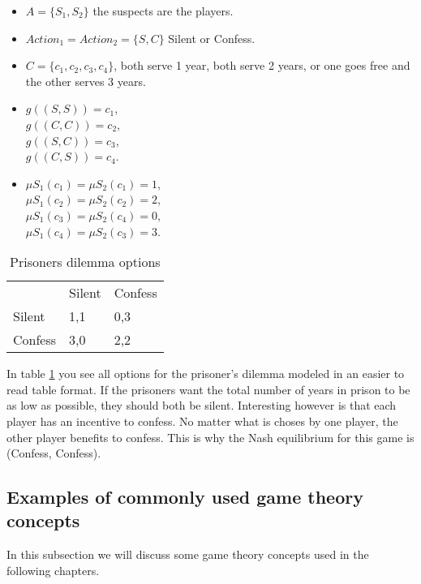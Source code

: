 \begin{itemize}
    \item $A = \{S_{1}, S_{2} \}$ the suspects are the players.
    \item $Action_{1} = Action_{2} = \{S, C\}$ Silent or Confess.
    \item $C = \{c_{1},c_{2},c_{3},c_{4}\}$, both serve 1 year, both serve 2 years, or one goes free and the other serves 3 years.
    \item $g((S,S)) = c_{1}$, \\
    $g((C,C)) = c_{2}$, \\
    $g((S,C)) = c_{3}$, \\
    $g((C,S)) = c_{4}$.
    \item $\mu S_{1}(c_{1}) = \mu S_{2}(c_{1}) = 1$, \\
    $\mu S_{1}(c_{2}) = \mu S_{2}(c_{2}) = 2$, \\
    $\mu S_{1}(c_{3}) = \mu S_{2}(c_{4}) = 0$, \\
    $\mu S_{1}(c_{4}) = \mu S_{2}(c_{3}) = 3$.
\end{itemize}

\begin{table}[h]
\centering
\begin{tabular}{lll}
 & Silent & Confess \\ \cline{2-3} 
\multicolumn{1}{l|}{Silent} & \multicolumn{1}{l|}{1,1} & \multicolumn{1}{l|}{0,3} \\ \cline{2-3} 
\multicolumn{1}{l|}{Confess} & \multicolumn{1}{l|}{3,0} & \multicolumn{1}{l|}{2,2} \\ \cline{2-3} 
\end{tabular}
\caption{Prisoners dilemma options}
\label{prisoners-d}
\end{table}

In table \ref{prisoners-d} you see all options for the prisoner's dilemma modeled in an easier to read table format. If the prisoners want the total number of years in prison to be as low as possible, they should both be silent. Interesting however is that each player has an incentive to confess. No matter what is choses by one player, the other player benefits to confess. This is why the Nash equilibrium for this game is (Confess, Confess).    

\subsection{Examples of commonly used game theory concepts}
In this subsection we will discuss some game theory concepts used in the following chapters. 

